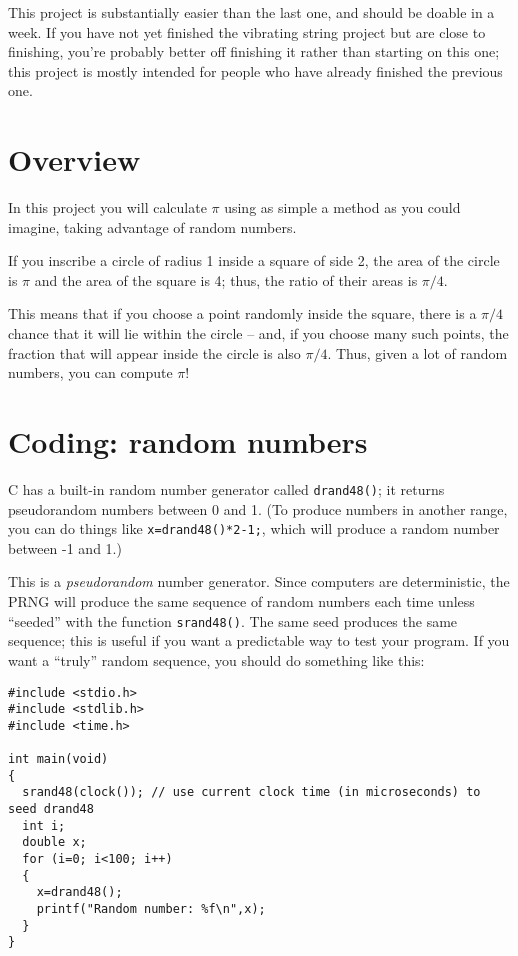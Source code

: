 \documentclass[12pt]{article}
\begin{document}
\Large
\centerline{}

\normalsize

This project is substantially easier than the last one, and should be doable in a week. If you have not yet finished the vibrating string project but are close to finishing, you're probably better off finishing it rather than starting on this one;
this project is mostly intended for people who have already finished the previous one. 



\section{Overview}

In this project you will calculate $\pi$ using as simple a method as you could imagine, taking advantage of random numbers.

If you inscribe a circle of radius 1 inside a square of side 2, the area of the circle is $\pi$ and the area of the square is 4; thus, the ratio of their areas is $\pi/4$. 

This means that if you choose a point randomly inside the square, there is a $\pi/4$ chance that it will lie within the circle -- and, if you choose many such points, the fraction that will appear inside the circle
is also $\pi/4$. Thus, given a lot of random numbers, you can compute $\pi$!

\section{Coding: random numbers}

C has a built-in random number generator called {\tt drand48()}; it returns pseudorandom numbers between 0 and 1. (To produce numbers in another range, you can do things like {\tt x=drand48()*2-1;}, which will
produce a random number between -1 and 1.)

This is a {\it pseudorandom} number generator. Since computers are deterministic, the PRNG will produce the same sequence of random numbers each time unless ``seeded'' with the function {\tt srand48()}. The same seed
produces the same sequence; this is useful if you want a predictable way to test your program. If you want a ``truly'' random sequence, you should do something like this:

\begin{verbatim}
#include <stdio.h>
#include <stdlib.h>
#include <time.h>

int main(void)
{
  srand48(clock()); // use current clock time (in microseconds) to seed drand48
  int i;
  double x;
  for (i=0; i<100; i++)
  {
    x=drand48();
    printf("Random number: %f\n",x);
  }
}
\end{verbatim}
\end{document}

